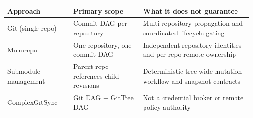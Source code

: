 
\begin{tabular}{p{3.2cm}p{4.4cm}p{6.6cm}}
\textbf{Approach} & \textbf{Primary scope} & \textbf{What it does not guarantee} \\
\hline
Git (single repo) & Commit DAG per repository & Multi-repository propagation and coordinated lifecycle gating \\
Monorepo & One repository, one commit DAG & Independent repository identities and per-repo remote ownership \\
Submodule management & Parent repo references child revisions & Deterministic tree-wide mutation workflow and snapshot contracts \\
ComplexGitSync & Git DAG + GitTree DAG & Not a credential broker or remote policy authority \\
\hline
\end{tabular}

